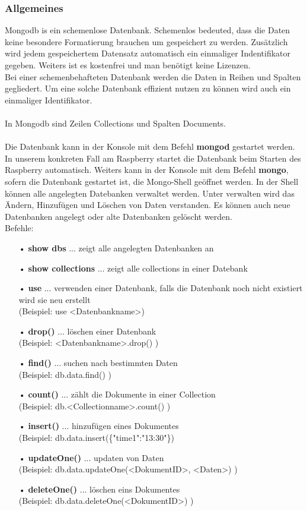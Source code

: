 \subsubsection{Allgemeines}
Mongodb is ein schemenlose Datenbank. Schemenlos bedeuted, dass die Daten keine besondere Formatierung brauchen um gespeichert zu werden. Zusätzlich wird jedem gespeichertem Datensatz automatisch ein einmaliger Indentifikator gegeben. Weiters ist es kostenfrei und man benötigt keine Lizenzen.
\\
Bei einer schemenbehafteten Datenbank werden die Daten in Reihen und Spalten gegliedert. Um eine solche Datenbank effizient nutzen zu können wird auch ein einmaliger Identifikator.
\\ \\ 
In Mongodb sind Zeilen Collections und Spalten Documents. 
\\ \\
Die Datenbank kann in der Konsole mit dem Befehl \textbf{mongod} gestartet werden. In unserem konkreten Fall am Raspberry startet die Datenbank beim Starten des Raspberry automatisch. Weiters kann in der Konsole mit dem Befehl \textbf{mongo}, sofern die Datenbank gestartet ist, die Mongo-Shell geöffnet werden. In der Shell können alle angelegten Datebanken verwaltet werden. Unter verwalten wird das Ändern, Hinzufügen und Löschen von Daten verstanden. Es können auch neue Datenbanken angelegt oder alte Datenbanken gelöscht werden. 
\\ Befehle:
\begin{itemize}
\item[•] \textbf{show dbs} ... zeigt alle angelegten Datenbanken an
\item[•] \textbf{show collections} ... zeigt alle collections in einer Datebank
\item[•] \textbf{use} ... verwenden einer Datenbank, falls die Datenbank noch nicht existiert wird sie neu erstellt 
\\     (Beispiel: use <Datenbankname>)
\item[•] \textbf{drop()} ... löschen einer Datenbank
\\     (Beispiel: <Datenbankname>.drop() )
\item[•] \textbf{find()} ... suchen nach bestimmten Daten 
\\     (Beispiel: db.data.find() )
\item[•] \textbf{count()} ... zählt die Dokumente in einer Collection
\\     (Beispiel: db.<Collectionname>.count() )
\item[•] \textbf{insert()} ... hinzufügen eines Dokumentes
\\     (Beispiel: db.data.insert(\{"time1":"13:30"\})
\item[•] \textbf{updateOne()} ... updaten von Daten
\\     (Beispiel: db.data.updateOne(<DokumentID>, <Daten>) )
\item[•] \textbf{deleteOne()} ... löschen eins Dokumentes
\\     (Beispiel: db.data.deleteOne(<DokumentID>) )

\end{itemize}

